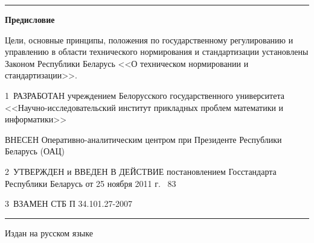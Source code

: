 \vskip0.5mm

\hrule 

\rule{0pt}{5mm}
	 
\centerline{\bf Предисловие} 

Цели, основные принципы, положения по государственному регулированию и 
управлению в области технического нормирования и стандартизации 
установлены Законом Республики Беларусь <<О техническом нормировании и 
стандартизации>>.  

\vskip0.2cm

1~РАЗРАБОТАН учреждением Белорусского государственного университета
<<Науч\-но-исследовательский институт прикладных проблем математики и информатики>>

ВНЕСЕН Оперативно-аналитическим центром при Президенте Республики Беларусь (ОАЦ)

2~УТВЕРЖДЕН и ВВЕДЕН В ДЕЙСТВИЕ постановлением Госстандарта Республики 
Беларусь от 25 ноября 2011 г. \No~83 

3~ВЗАМЕН СТБ П 34.101.27-2007 

\vfill

\hrule
\vskip1mm
Издан на русском языке

\pagebreak
